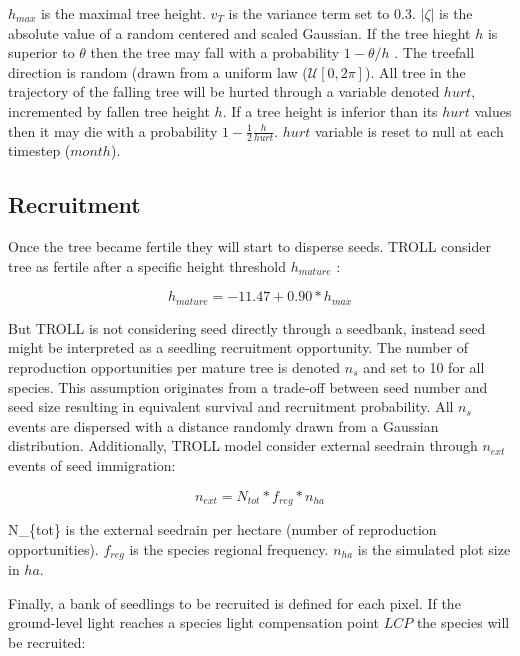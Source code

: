 \documentclass[]{article}
\theoremstyle{definition}
\theoremstyle{definition}
\theoremstyle{remark}
\begin{document}
\(h_{max}\) is the maximal tree height. \(v_T\) is the variance term set
to 0.3. \(|\zeta|\) is the absolute value of a random centered and
scaled Gaussian. If the tree hieght \(h\) is superior to \(\theta\) then
the tree may fall with a probability \(1-\theta/h\) \citep{Chave1999}.
The treefall direction is random (drawn from a uniform law
(\(\mathcal{U}[0,2\pi]\)). All tree in the trajectory of the falling
tree will be hurted through a variable denoted \(hurt\), incremented by
fallen tree height \(h\). If a tree height is inferior than its \(hurt\)
values then it may die with a probability
\(1-\frac{1}{2}\frac{h}{hurt}\). \(hurt\) variable is reset to null at
each timestep (\(month\)).

\subsection{Recruitment}\label{recruitment}

Once the tree became fertile they will start to disperse seeds. TROLL
consider tree as fertile after a specific height threshold
\(h_{mature}\) \citep{Wright2005}:

\begin{equation}
  h_{mature} = -11.47+0.90*h_{max}
  \label{eq:hmature}
\end{equation}

But TROLL is not considering seed directly through a seedbank, instead
seed might be interpreted as a seedling recruitment opportunity. The
number of reproduction opportunities per mature tree is denoted \(n_s\)
and set to 10 for all species. This assumption originates from a
trade-off between seed number and seed size resulting in equivalent
survival and recruitment probability. All \(n_s\) events are dispersed
with a distance randomly drawn from a Gaussian distribution.
Additionally, TROLL model consider external seedrain through \(n_{ext}\)
events of seed immigration:

\begin{equation}
  n_{ext} = N_{tot}*f_{reg}*n_{ha}
  \label{eq:next}
\end{equation}

N\_\{tot\} is the external seedrain per hectare (number of reproduction
opportunities). \(f_{reg}\) is the species regional frequency.
\(n_{ha}\) is the simulated plot size in \(ha\).

Finally, a bank of seedlings to be recruited is defined for each pixel.
If the ground-level light reaches a species light compensation point
\(LCP\) the species will be recruited:
\end{document}
